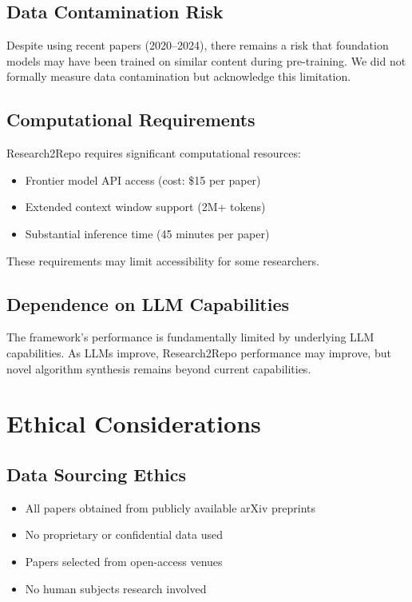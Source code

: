 \documentclass[10pt]{article}
\begin{document}
\subsection{Data Contamination Risk}
Despite using recent papers (2020--2024), there remains a risk that foundation models may have been trained on similar content during pre-training. We did not formally measure data contamination but acknowledge this limitation.

\subsection{Computational Requirements}
Research2Repo requires significant computational resources:
\begin{itemize}
    \item Frontier model API access (cost: \$15 per paper)
    \item Extended context window support (2M+ tokens)
    \item Substantial inference time (45 minutes per paper)
\end{itemize}
These requirements may limit accessibility for some researchers.

\subsection{Dependence on LLM Capabilities}
The framework's performance is fundamentally limited by underlying LLM capabilities. As LLMs improve, Research2Repo performance may improve, but novel algorithm synthesis remains beyond current capabilities.

\section{Ethical Considerations}

\subsection{Data Sourcing Ethics}
\begin{itemize}
    \item All papers obtained from publicly available arXiv preprints
    \item No proprietary or confidential data used
    \item Papers selected from open-access venues
    \item No human subjects research involved
\end{itemize}
\end{document}
